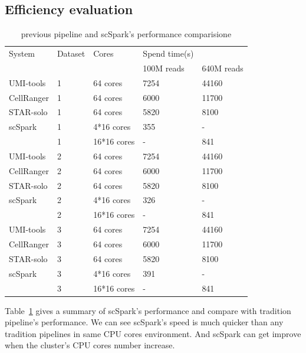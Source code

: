 \documentclass[conference]{IEEEtran}
\begin{document}
\subsection{Efficiency evaluation}
\begin{table}
	\centering
	\caption{previous pipeline and scSpark's performance comparisione}\label{tab1}
	\resizebox{0.45\textwidth}{!} {
	\begin{tabular}{l | l | l | l  l}
		\hline
		System & Dataset & Cores & Spend time(s) \\
		& & & 100M reads & 640M reads  \\
		\hline
		UMI-tools & 1 & 64 cores & 7254 & 44160 \\
		CellRanger & 1 & 64 cores & 6000 & 11700 \\
		STAR-solo & 1 & 64 cores &  5820 & 8100 \\
		scSpark & 1 & 4*16 cores & 355 & - \\
		& 1 & 16*16 cores & - & 841 \\
		UMI-tools & 2 & 64 cores & 7254 & 44160 \\
		CellRanger & 2 & 64 cores & 6000 & 11700 \\
		STAR-solo & 2 & 64 cores &  5820 & 8100 \\
		scSpark & 2 & 4*16 cores & 326 & - \\
		& 2 & 16*16 cores & - & 841 \\
		UMI-tools & 3 & 64 cores & 7254 & 44160 \\
		CellRanger & 3 & 64 cores & 6000 & 11700 \\
		STAR-solo & 3 & 64 cores &  5820 & 8100 \\
		scSpark & 3 & 4*16 cores & 391 & - \\
		& 3 & 16*16 cores & - & 841 \\
		\hline
	\end{tabular}
	}
\end{table}
Table~\ref{tab1} gives a summary of scSpark's performance and compare with tradition pipeline's performance.
We can see scSpark's speed is much quicker than any tradition pipelines in same CPU cores environment.
And scSpark can get improve when the cluster's CPU cores number increase.
\end{document}
